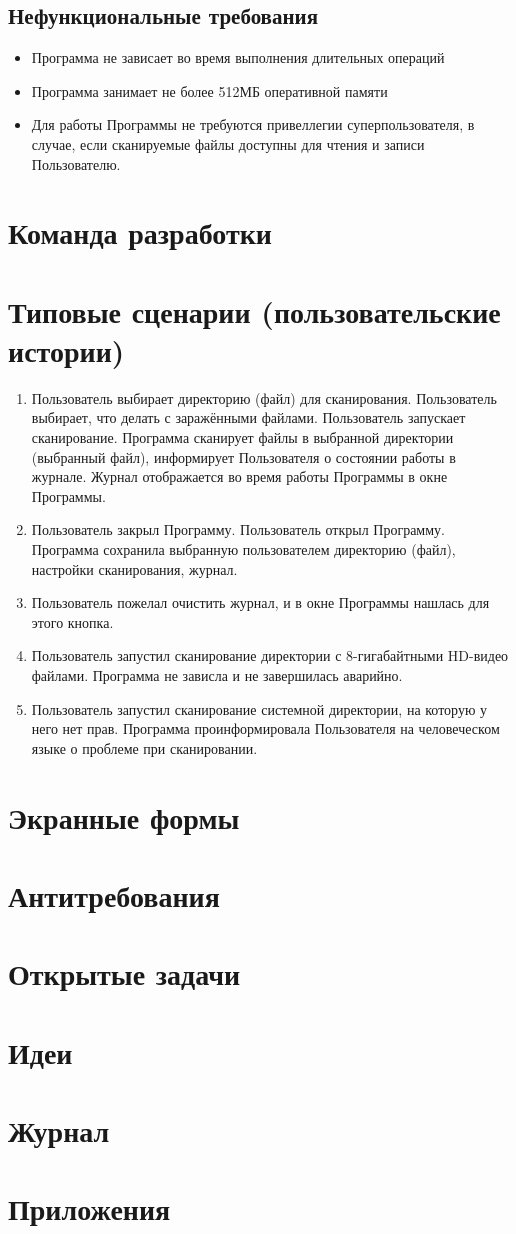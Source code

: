 \subsection{Нефункциональные требования}
\begin{itemize}
\item Программа не зависает во время выполнения длительных операций
\item Программа занимает не более 512МБ оперативной памяти
\item Для работы Программы не требуются привеллегии суперпользователя, в случае, если сканируемые файлы доступны для чтения и записи Пользователю.
\end{itemize}
\section{Команда разработки}
\section{Типовые сценарии (пользовательские истории)}
\begin{enumerate}
\item Пользователь выбирает директорию (файл) для сканирования. Пользователь выбирает, что делать с заражёнными файлами. Пользователь запускает сканирование. Программа сканирует файлы в выбранной директории (выбранный файл), информирует Пользователя о состоянии работы в журнале. Журнал отображается во время работы Программы в окне Программы.
\item Пользователь закрыл Программу. Пользователь открыл Программу. Программа сохранила выбранную пользователем директорию (файл), настройки сканирования, журнал.
\item Пользователь пожелал очистить журнал, и в окне Программы нашлась для этого кнопка.
\item Пользователь запустил сканирование директории с 8-гигабайтными HD-видео файлами. Программа не зависла и не завершилась аварийно.
\item Пользователь запустил сканирование системной директории, на которую у него нет прав. Программа проинформировала Пользователя на человеческом языке о проблеме при сканировании.
\end{enumerate}
\section{Экранные формы}
\section{Антитребования}
\section{Открытые задачи}
\section{Идеи}
\section{Журнал}
\section{Приложения}
